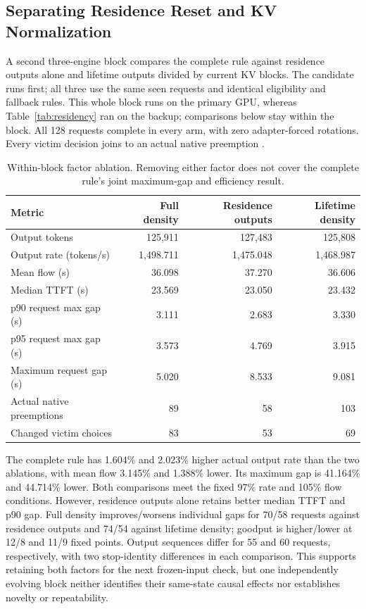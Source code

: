 \documentclass[10pt]{article}
\begin{document}
\subsection{Separating Residence Reset and KV Normalization}
A second three-engine block compares the complete rule against residence outputs alone and lifetime outputs divided by current KV blocks. The candidate runs first; all three use the same seen requests and identical eligibility and fallback rules. This whole block runs on the primary GPU, whereas Table~\ref{tab:residency} ran on the backup; comparisons below stay within the block. All 128 requests complete in every arm, with zero adapter-forced rotations. Every victim decision joins to an actual native preemption \cite{residencyablation}.

\begin{table}[t]
\centering\small
\caption{Within-block factor ablation. Removing either factor does not cover the complete rule's joint maximum-gap and efficiency result.}
\label{tab:residencyablation}
\begin{tabular}{lrrr}
\toprule
Metric & Full density & Residence outputs & Lifetime density \\
\midrule
Output tokens & 125,911 & 127,483 & 125,808 \\
Output rate (tokens/s) & 1,498.711 & 1,475.048 & 1,468.987 \\
Mean flow (s) & 36.098 & 37.270 & 36.606 \\
Median TTFT (s) & 23.569 & 23.050 & 23.432 \\
p90 request max gap (s) & 3.111 & 2.683 & 3.330 \\
p95 request max gap (s) & 3.573 & 4.769 & 3.915 \\
Maximum request gap (s) & 5.020 & 8.533 & 9.081 \\
Actual native preemptions & 89 & 58 & 103 \\
Changed victim choices & 83 & 53 & 69 \\
\bottomrule
\end{tabular}
\end{table}

The complete rule has 1.604\% and 2.023\% higher actual output rate than the two ablations, with mean flow 3.145\% and 1.388\% lower. Its maximum gap is 41.164\% and 44.714\% lower. Both comparisons meet the fixed 97\% rate and 105\% flow conditions. However, residence outputs alone retains better median TTFT and p90 gap. Full density improves/worsens individual gaps for 70/58 requests against residence outputs and 74/54 against lifetime density; goodput is higher/lower at 12/8 and 11/9 fixed points. Output sequences differ for 55 and 60 requests, respectively, with two stop-identity differences in each comparison. This supports retaining both factors for the next frozen-input check, but one independently evolving block neither identifies their same-state causal effects nor establishes novelty or repeatability.
\end{document}
